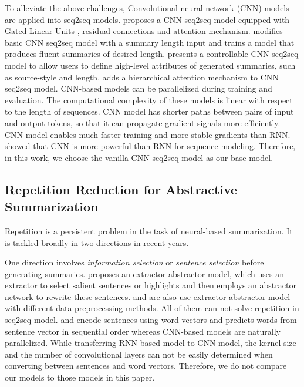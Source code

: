 To alleviate the above challenges,
Convolutional neural network (CNN) 
models~\citep{gehring2017convs2s,FanGA18,LiuLZ18,Zhang2019AbstractTS} 
are applied into seq2seq models.
\cite{gehring2017convs2s} proposes a CNN seq2seq model equipped with
Gated Linear Units \citep{DauphinFAG17}, residual connections \citep{HeZRS16}
and attention mechanism. 
\cite{LiuLZ18} modifies basic CNN seq2seq model with a summary length
input and trains a model that produces fluent summaries of desired length.
\cite{FanGA18} presents a controllable CNN seq2seq model to
allow users to define high-level attributes of generated
summaries, such as source-style and length.
\cite{Zhang2019AbstractTS} adds a hierarchical attention mechanism to CNN seq2seq model.
CNN-based models can be parallelized during
training and evaluation. The computational complexity of
these models is linear with respect to the length of sequences.
CNN model has shorter paths between pairs of input and
output tokens, so that it can propagate gradient signals more
efficiently.
CNN model enables much faster training and more stable gradients 
than RNN. 
\cite{bai2018empirical} showed that CNN is more powerful than 
RNN for sequence modeling.
Therefore, in this work, we choose the vanilla CNN seq2seq model as 
our base model.

\subsection{Repetition Reduction for Abstractive Summarization}
Repetition is a persistent problem in the task of 
neural-based summarization. 
It is tackled broadly in two directions in recent years. 

One direction involves {\em information selection} or 
{\em sentence selection} before generating summaries.
\cite{P18-1063} proposes an extractor-abstractor model, which uses an extractor  
to select salient sentences or highlights and then employs 
an abstractor network to rewrite these sentences.
\cite{SharmaHHW19} and \cite{SanghwanB19} are also use extractor-abstractor model 
with different data preprocessing methods.
All of them can not solve repetition in seq2seq model.
\cite{TanWX17} and \cite{D18-1205,D18-1441} encode
sentences using word vectors
and predicts words from sentence vector in sequential order 
whereas CNN-based models are naturally parallelized. 
While transferring RNN-based model to CNN model, 
the kernel size and the number of 
convolutional layers can not be easily determined when
converting between sentences and word vectors. 
Therefore, we do not compare our models to those models in this paper. 


